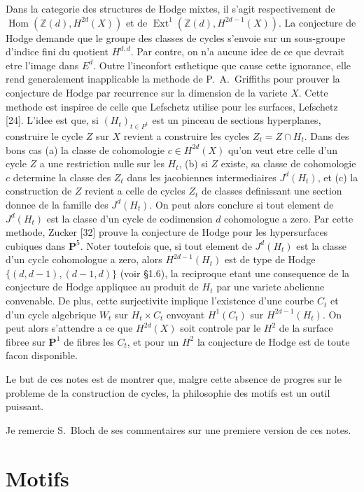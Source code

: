 \documentclass[11pt,a4paper]{article}
\theoremstyle{plain}
\theoremstyle{definition}
\DeclareMathOperator{\Ext}{Ext}
\DeclareMathOperator{\Hom}{Hom}
\newcommand{\Z}{\mathbb{Z}}
\begin{document}
Dans la categorie des structures de Hodge mixtes, il s'agit respectivement de
$\Hom(\Z(d), H^{2d}(X))$ et de $\Ext^1(\Z(d), H^{2d-1}(X))$. La conjecture de Hodge demande que le groupe des classes de cycles s'envoie sur un sous-groupe d'indice fini du quotient $H^{d,d}$. Par contre, on n'a aucune idee de ce que devrait etre l'image dans $E^d$. Outre l'inconfort esthetique que cause cette ignorance, elle rend generalement inapplicable la methode de P.~A.~Griffiths pour prouver la conjecture de Hodge par recurrence sur la dimension de la variete $X$. Cette methode est inspiree de celle que Lefschetz utilise pour les surfaces, Lefschetz [24]. L'idee est que, si $(H_t)_{t \in P^1}$ est un pinceau de sections hyperplanes, construire le cycle $Z$ sur $X$ revient a construire les cycles $Z_t = Z \cap H_t$. Dans des bons cas (a) la classe de cohomologie $c \in H^{2d}(X)$ qu'on veut etre celle d'un cycle $Z$ a une restriction nulle sur les $H_t$, (b) si $Z$ existe, sa classe de cohomologie $c$ determine la classe des $Z_t$ dans les jacobiennes intermediaires $J^d(H_t)$, et (c) la construction de $Z$ revient a celle de cycles $Z_t$ de classes definissant une section donnee de la famille des $J^d(H_t)$. On peut alors conclure si tout element de $J^d(H_t)$ est la classe d'un cycle de codimension $d$ cohomologue a zero. Par cette methode, Zucker [32] prouve la conjecture de Hodge pour les hypersurfaces cubiques dans $\mathbf{P}^5$. Noter toutefois que, si tout element de $J^d(H_t)$ est la classe d'un cycle cohomologue a zero, alors $H^{2d-1}(H_t)$ est de type de Hodge $\{(d, d-1), (d-1, d)\}$ (voir \S1.6), la reciproque etant une consequence de la conjecture de Hodge appliquee au produit de $H_t$ par une variete abelienne convenable. De plus, cette surjectivite implique l'existence d'une courbe $C_t$ et d'un cycle algebrique $W_t$ sur $H_t \times C_t$ envoyant $H^1(C_t)$ sur $H^{2d-1}(H_t)$. On peut alors s'attendre a ce que $H^{2d}(X)$ soit controle par le $H^2$ de la surface fibree sur $\mathbf{P}^1$ de fibres les $C_t$, et pour un $H^2$ la conjecture de Hodge est de toute facon disponible.

\vspace{0.5em}

Le but de ces notes est de montrer que, malgre cette absence de progres sur le probleme de la construction de cycles, la philosophie des motifs est un outil puissant.

Je remercie S.~Bloch de ses commentaires sur une premiere version de ces notes.


\section{Motifs}
\end{document}
